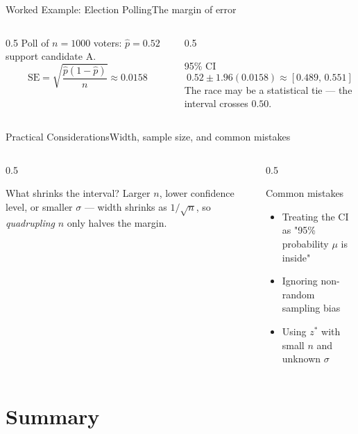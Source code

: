 \documentclass[aspectratio=169,11pt]{beamer}
\begin{document}
\begin{frame}{Worked Example: Election Polling}{The margin of error}
  \begin{columns}[T]
    \begin{column}{0.5\textwidth}
      \small Poll of $n=1000$ voters: $\hat p = 0.52$ support candidate A.
      \[ \text{SE} = \sqrt{\frac{\hat p(1-\hat p)}{n}} \approx 0.0158 \]
    \end{column}
    \begin{column}{0.5\textwidth}
      \begin{exampleblock}{95\% CI}
        \[ 0.52 \pm 1.96(0.0158) \approx [0.489,\, 0.551] \]
        \small The race may be a statistical tie — the interval crosses
        $0.50$.
      \end{exampleblock}
    \end{column}
  \end{columns}
\end{frame}

\begin{frame}{Practical Considerations}{Width, sample size, and common mistakes}
  \begin{columns}[T]
    \begin{column}{0.5\textwidth}
      \begin{block}{What shrinks the interval?}
        \small Larger $n$, lower confidence level, or smaller $\sigma$ —
        width shrinks as $1/\sqrt n$, so \emph{quadrupling} $n$ only halves
        the margin.
      \end{block}
    \end{column}
    \begin{column}{0.5\textwidth}
      \begin{alertblock}{Common mistakes}
        \small
        \begin{itemize}
          \item Treating the CI as "95\% probability $\mu$ is inside"
          \item Ignoring non-random sampling bias
          \item Using $z^\ast$ with small $n$ and unknown $\sigma$
        \end{itemize}
      \end{alertblock}
    \end{column}
  \end{columns}
\end{frame}

\section{Summary}
\end{document}
